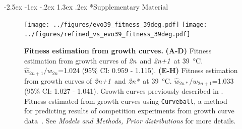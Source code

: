 \documentclass[12pt]{extarticle}
\makeatletter
\renewcommand\section{\@startsection {section}{1}{\z@}%
     {-2.5ex \@plus -1ex \@minus -.2ex}%
     {1.3ex \@plus.2ex}%
    {\Large\bfseries}}
\newcommand{\euwt}{\emph{2n}}
\newcommand{\anwt}{\emph{2n+1}}
\newcommand{\eumt}{\emph{2n*}}
\newcommand{\beginsupplement}{%
      	\setcounter{table}{0}
        \renewcommand{\thetable}{S\arabic{table}}%
        \setcounter{figure}{0}
        \renewcommand{\thefigure}{S\arabic{figure}}%
}
\makeatother
\begin{document}
\newpage

\section*{Supplementary Material}
\beginsupplement %

\begin{figure}[h]
	\centering
	\texttt{[image: ../figures/evo39\_fitness\_39deg.pdf]} 
	\texttt{[image: ../figures/refined\_vs\_evo39\_fitness\_39deg.pdf]}
\caption{
    \textbf{Fitness estimation from growth curves.}
    \textbf{(A-D)} Fitness estimation from growth curves of \euwt\ and \anwt\ at \SI{39}{\celsius}. $\hat w_{2n+1}/w_{2n}$=1.024 (95\% CI: 0.959 - 1.115).
    \textbf{(E-H)} Fitness estimation from growth curves of \anwt\ and \eumt\ at \SI{39}{\celsius}. $\hat w_{2n*}/w_{2n+1}$=1.033 (95\% CI: 1.027 - 1.041).
    Growth curves previously described in \citet[Figs. 3C, 4A, and S2]{Yona2012}.
	Fitness estimated from growth curves using \texttt{Curveball}, a method for predicting results of competition experiments from growth curve data~\citep[\href{https://curveball.yoavram.com}{curveball.yoavram.com}]{Ram2019}. See \emph{Models and Methods, Prior distributions} for more details.
} 
\label{fig:growth-curves}
\end{figure}
\end{document}
